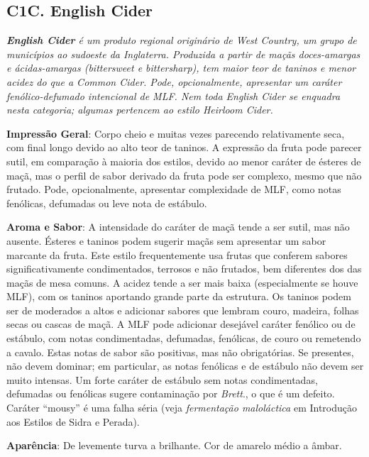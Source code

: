 \subsection*{C1C. English Cider}

\textit{\textbf{English Cider} é um produto regional originário de West Country, um grupo de municípios ao sudoeste da Inglaterra. Produzida a partir de maçãs doces-amargas e ácidas-amargas (\textit{bittersweet} e \textit{bittersharp}), tem maior teor de taninos e menor acidez do que a Common Cider. Pode, opcionalmente, apresentar um caráter fenólico-defumado intencional de MLF. Nem toda English Cider se enquadra nesta categoria; algumas pertencem ao estilo Heirloom Cider.}

\textbf{Impressão Geral}: Corpo cheio e muitas vezes parecendo relativamente seca, com final longo devido ao alto teor de taninos. A expressão da fruta pode parecer sutil, em comparação à maioria dos estilos, devido ao menor caráter de ésteres de maçã, mas o perfil de sabor derivado da fruta pode ser complexo, mesmo que não frutado. Pode, opcionalmente, apresentar complexidade de MLF, como notas fenólicas, defumadas ou leve nota de estábulo.

\textbf{Aroma e Sabor}: A intensidade do caráter de maçã tende a ser sutil, mas não ausente. Ésteres e taninos podem sugerir maçãs sem apresentar um sabor marcante da fruta. Este estilo frequentemente usa frutas que conferem sabores significativamente condimentados, terrosos e não frutados, bem diferentes dos das maçãs de mesa comuns. A acidez tende a ser mais baixa (especialmente se houve MLF), com os taninos aportando grande parte da estrutura. Os taninos podem ser de moderados a altos e adicionar sabores que lembram couro, madeira, folhas secas ou cascas de maçã. A MLF pode adicionar desejável caráter fenólico ou de estábulo, com notas condimentadas, defumadas, fenólicas, de couro ou remetendo a cavalo. Estas notas de sabor são positivas, mas não obrigatórias. Se presentes, não devem dominar; em particular, as notas fenólicas e de estábulo não devem ser muito intensas. Um forte caráter de estábulo sem notas condimentadas, defumadas ou fenólicas sugere contaminação por \textit{Brett}., o que é um defeito. Caráter “mousy” é uma falha séria (veja \textit{fermentação maloláctica} em Introdução aos Estilos de Sidra e Perada).

\textbf{Aparência}: De levemente turva a brilhante. Cor de amarelo médio a âmbar.

